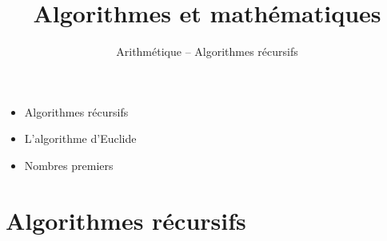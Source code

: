 



\newcommand{\Python}{\texttt{Python}}
\renewcommand{\evidence}[1]{{\color{blue}\textbf{#1}}}

\usepackage{textcomp}

\usepackage{listings}



\newcommand{\codeinline}[1]{\lstinline!#1!}







\title{{\bf Algorithmes et mathématiques}}
\subtitle{Arithmétique -- Algorithmes récursifs}

\begin{frame}
  
  \debutmontitre

  \pause

{\footnotesize
\hfill
{}
\begin{minipage}{0.6\textwidth}
  \begin{itemize}
    \item<3-> Algorithmes récursifs
    \item<4-> L'algorithme d'Euclide
    \item<5-> Nombres premiers
  \end{itemize}
\end{minipage}
}

\end{frame}

\setcounter{framenumber}{0}


\section{Algorithmes récursifs}


